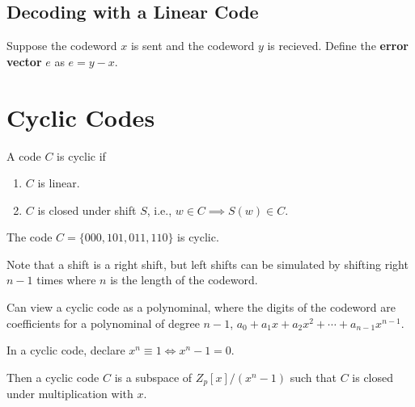 \documentclass{article}
\begin{document}
\subsection{Decoding with a Linear Code}
\begin{definition}
  Suppose the codeword \( x \) is sent and the codeword \( y \) is
  recieved. Define the \textbf{error vector} \( e \) as \( e = y-x \).
\end{definition}
\section{Cyclic Codes}
\begin{definition}
  A code \( C \) is cyclic if
  \begin{enumerate}
    \item \( C \) is linear.
    \item \( C \) is closed under shift \( S \), i.e., \( w \in C
      \implies S(w) \in C \).
  \end{enumerate}
\end{definition}
\begin{example}
  The code \( C = \{000, 101, 011, 110\} \) is cyclic.
\end{example}
\begin{remark}
  Note that a shift is a right shift, but left shifts can be
  simulated by shifting right \( n-1 \) times where \( n \) is the
  length of the codeword.
\end{remark}
\begin{remark}
  Can view a cyclic code as a polynominal, where the digits of the
  codeword are coefficients for a polynominal of degree \( n-1 \), \(
  a_0 + a_1x + a_2x^2 + \cdots + a_{n-1} x^{n-1}  \).
\end{remark}
\begin{definition}
  In a cyclic code, declare \( x^n \equiv 1 \iff x^n-1 = 0 \).

  Then a cyclic code \( C \) is a subspace of  \( Z_p[x]/(x^n-1) \)
  such that \( C \) is closed under multiplication with \( x \).

\end{definition}
\end{document}
